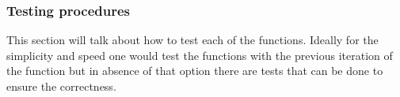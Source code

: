 \documentclass[a4paper,10pt]{article}
\begin{document}
\subsubsection{Testing procedures}

This section will talk about how to test each of the functions. Ideally for the simplicity and speed one would test the functions with the previous iteration of the function but in absence of that option there are tests that can be done to ensure the correctness.
\end{document}

